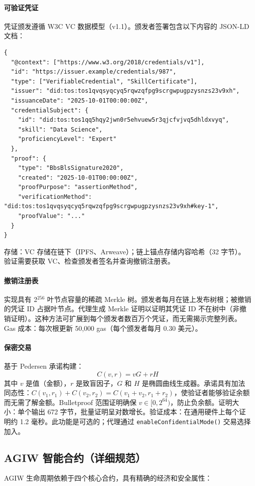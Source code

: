 \documentclass[11pt]{article}
\begin{document}
\paragraph{可验证凭证} 凭证颁发遵循 W3C VC 数据模型（v1.1）。颁发者签署包含以下内容的 JSON-LD 文档：
\begin{verbatim}
{
  "@context": ["https://www.w3.org/2018/credentials/v1"],
  "id": "https://issuer.example/credentials/987",
  "type": ["VerifiableCredential", "SkillCertificate"],
  "issuer": "did:tos:tos1qvqsyqcyq5rqwzqfpg9scrgwpugpzysnzs23v9xh",
  "issuanceDate": "2025-10-01T00:00:00Z",
  "credentialSubject": {
    "id": "did:tos:tos1qq5hqy2jwn0r5ehvuew5r3qjcfvjvq5dhldxvyq",
    "skill": "Data Science",
    "proficiencyLevel": "Expert"
  },
  "proof": {
    "type": "BbsBlsSignature2020",
    "created": "2025-10-01T00:00:00Z",
    "proofPurpose": "assertionMethod",
    "verificationMethod": "did:tos:tos1qvqsyqcyq5rqwzqfpg9scrgwpugpzysnzs23v9xh#key-1",
    "proofValue": "..."
  }
}
\end{verbatim}
存储：VC 存储在链下（IPFS、Arweave）；链上锚点存储内容哈希（32 字节）。验证需要获取 VC、检查颁发者签名并查询撤销注册表。

\paragraph{撤销注册表} 实现具有 2$^{256}$ 叶节点容量的稀疏 Merkle 树。颁发者每月在链上发布树根；被撤销的凭证 ID 占据叶节点。代理生成 Merkle 证明以证明其凭证 ID 不在树中（非撤销证明）。这种方法可扩展到每个颁发者数百万个凭证，而无需揭示完整列表。Gas 成本：每次根更新 50,000 gas（每个颁发者每月 0.30 美元）。

\paragraph{保密交易} 基于 Pedersen 承诺构建：
\begin{equation}
C(v, r) = vG + rH
\end{equation}
其中 $v$ 是值（金额），$r$ 是致盲因子，$G$ 和 $H$ 是椭圆曲线生成器。承诺具有加法同态性：$C(v_1, r_1) + C(v_2, r_2) = C(v_1 + v_2, r_1 + r_2)$，使验证者能够验证余额而无需了解金额。Bulletproof 范围证明确保 $v \in [0, 2^{64})$，防止负余额。证明大小：单个输出 672 字节，批量证明呈对数增长。验证成本：在通用硬件上每个证明约 1.2 毫秒。此功能是可选的；代理通过 \texttt{enableConfidentialMode()} 交易选择加入。

\subsection{AGIW 智能合约（详细规范）}
\label{sec:agiw-contracts}
AGIW 生命周期依赖于四个核心合约，具有精确的经济和安全属性：
\end{document}
